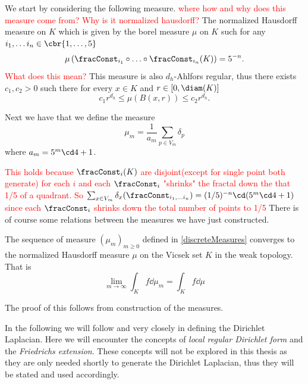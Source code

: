 We start by considering the following measure. 
\textcolor{red}{where how and why does this measure come from? Why is it normalized hausdorff?}
The normalized Hausdorff measure on $K$ which is given by the borel measure $\mu$ on $K$ such for any $i_1, \ldots i_n \in \cbr{1, \ldots, 5}$
\begin{equation}\label{normalziedHausdorffMeasure}
	\mu\left(\fracConst_{i_1} \circ \ldots \circ \fracConst_{i_n}(K)\right) = 5^{-n}.
\end{equation}
\textcolor{red}{What does this mean?}
This measure is also $d_h$-Ahlfors regular, thus there exists $c_1, c_2 > 0$ such there for every $x \in K$ and $r \in [0, \diam(K)]$
\begin{equation}
	c_1r^{d_h} \leq \mu(B(x,r)) \leq c_2 r^{d_h}.
\end{equation}

Next we have that we define the measure
\begin{equation}\label{discreteMeasures}
	\mu_m = \frac{1}{a_m} \sum_{p \in V_m} \delta_p
\end{equation}
where $a_m = 5^{m}\cd 4 + 1$. 

\textcolor{red}{This holds because $\fracConst_i(K)$ are disjoint(except for single point both generate) for each $i$ and each $\fracConst_i$ "shrinks" the fractal down the that 1/5 of a quadrant. So $\sum_{x \in V_m}\delta_x (\fracConst_{i_1, \ldots i_n}) = (1/5)^{-n}\cd (5^{m}\cd 4 +1 )$ since each $\fracConst_{i}$ shrinks down the total number of points to 1/5}
There is of course some relations between the measures we have just constructed.
\begin{lemma}\label{convergenceOfMeasures}
	The sequence of measure $(\mu_m)_{m \geq 0}$ defined in \eqref{discreteMeasures} converges to the normalized Hausdorff measure $\mu$ on the Vicsek set $K$ in the weak topology. That is
	\begin{equation}
		\lim_{m \to \infty} \int_{K}f \dd \mu_m = \int_{K} f \dd \mu
	\end{equation}
\end{lemma}
The proof of this follows from construction of the measures.



In the following we will follow \cite{Fabrice} and \cite{specAnal} very closely in defining the Dirichlet Laplacian. Here we will encounter the concepts of \emph{local regular Dirichlet form} and the \emph{Friedrichs extension}. These concepts will not be explored in this thesis as they are only needed shortly to generate the Dirichlet Laplacian, thus they will be stated and used accordingly.
 
